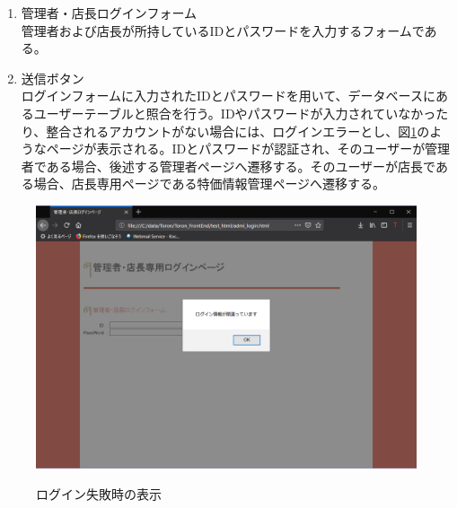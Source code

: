 \documentclass[a4j]{jarticle}
\begin{document}
\begin{enumerate}
  \renewcommand{\labelenumi}{\textcircled{\scriptsize \theenumi}}
	\item 管理者・店長ログインフォーム\\
	管理者および店長が所持しているIDとパスワードを入力するフォームである。
	\item 送信ボタン\\
	ログインフォームに入力されたIDとパスワードを用いて、データベースにあるユーザーテーブルと照合を行う。IDやパスワードが入力されていなかったり、整合されるアカウントがない場合には、ログインエラーとし、図\ref{login2}のようなページが表示される。IDとパスワードが認証され、そのユーザーが管理者である場合、後述する管理者ページへ遷移する。そのユーザーが店長である場合、店長専用ページである特価情報管理ページへ遷移する。
\end{enumerate}
\begin{figure}[H]
  \begin{center}

    \includegraphics[width=15cm]{login2.png} \\
    \caption{ログイン失敗時の表示}
    \label{login2}
  \end{center}
\end{figure}
\end{document}
